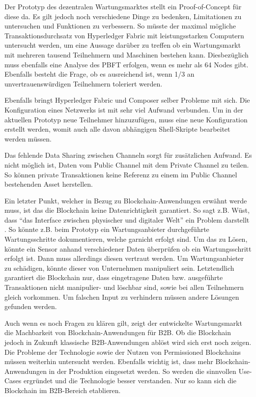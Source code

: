 Der Prototyp des dezentralen Wartungsmarktes stellt ein Proof-of-Concept für diese da. Es gilt jedoch noch verschiedene Dinge zu bedenken, Limitationen zu untersuchen und Funktionen zu verbessern. So müsste der maximal mögliche Transaktionsdurchsatz von Hyperledger Fabric mit leistungsstarken Computern untersucht werden, um eine Aussage darüber zu treffen ob ein Wartungsmarkt mit mehreren tausend Teilnehmern und Maschinen bestehen kann. Diesbezüglich muss ebenfalls eine Analyse des PBFT erfolgen, wenn es mehr als 64 Nodes gibt. Ebenfalls besteht die Frage, ob es ausreichend ist, wenn 1/3 an unvertrauenswürdigen Teilnehmern toleriert werden.

Ebenfalls bringt Hyperledger Fabric und Composer selber Probleme mit sich. Die Konfiguration eines Netzwerks ist mit sehr viel Aufwand verbunden. Um in der aktuellen Prototyp neue Teilnehmer hinzuzufügen, muss eine neue Konfiguration erstellt werden, womit auch alle davon abhängigen Shell-Skripte bearbeitet werden müssen. 

Das fehlende Data Sharing zwischen Channeln sorgt für zusätzlichen Aufwand. Es nicht möglich ist, Daten vom Public Channel mit dem Private Channel zu teilen. So können private Transaktionen keine Referenz zu einem im Public Channel bestehenden Asset herstellen.

Ein letzter Punkt, welcher in Bezug zu Blockchain-Anwendungen erwähnt werde muss, ist das die Blockchain keine Datenrichtigkeit garantiert. So sagt z.B. Wüst, dass ``das Interface zwischen physischer und digitaler Welt'' ein Problem darstellt \cite{WustyouneedBlockchain2017}. So könnte z.B. beim Prototyp ein Wartungsanbieter durchgeführte Wartungsschritte dokumentieren, welche garnicht erfolgt sind. Um das zu Lösen, könnte ein Sensor anhand verschiedener Daten überprüfen ob ein Wartungsschritt erfolgt ist. Dann muss allerdings diesen vertraut werden. Um Wartungsanbieter zu schädigen, könnte dieser von Unternehmen manipuliert sein. Letztendlich garantiert die Blockchain nur, dass eingetragene Daten bzw. ausgeführte Transaktionen nicht manipulier- und löschbar sind, sowie bei allen Teilnehmern gleich vorkommen. Um falschen Input zu verhindern müssen andere Lösungen gefunden werden.

Auch wenn es noch Fragen zu klären gilt, zeigt der entwickelte Wartungsmarkt die Machbarkeit von Blockchain-Anwendungen für B2B. Ob die Blockchain jedoch in Zukunft klassische B2B-Anwendungen ablöst wird sich erst noch zeigen. Die Probleme der Technologie sowie der Nutzen von Permissioned Blockchains müssen weiterhin untersucht werden. Ebenfalls wichtig ist, dass mehr Blockchain-Anwendungen in der Produktion eingesetzt werden. So werden die sinnvollen Use-Cases ergründet und die Technologie besser verstanden. Nur so kann sich die Blockchain im B2B-Bereich etablieren.





